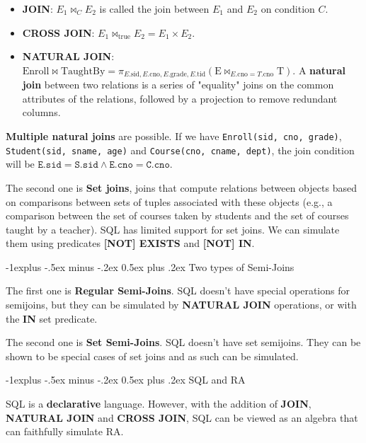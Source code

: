 \documentclass[10pt,landscape]{article}
\makeatletter
\newcommand{\term}[1]{{\color{blue} \textbf{#1}}}
\newcommand{\sql}[1]{{\color{cyan} \textbf{#1}}}
\newcommand{\exmp}[1]{{\texttt{#1}}}
\renewcommand{\subsection}{\@startsection{subsection}{2}{0mm}%
                                {-1explus -.5ex minus -.2ex}%
                                {0.5ex plus .2ex}%
                                {\normalfont\normalsize\bfseries}}
\makeatother
\begin{document}
\begin{multicols}{4}
\begin{itemize}
	\item \term{JOIN}: $E_1 \bowtie_C E_2$ is called the join between $E_1$ and $E_2$ on condition $C$.
	\item \term{CROSS JOIN}: $E_1 \bowtie_{\text{true}} E_2 = E_1 \times E_2$.
	\item \term{NATURAL JOIN}: $\text{Enroll} \bowtie \text{TaughtBy} = \pi_{E.\text{sid}, E.\text{cno}, E.\text{grade}, E.\text{tid}} (\text{E} \bowtie_{E.\text{cno} = T.\text{cno}} \text{T})$. A \term{natural join} between two relations is a series of "equality" joins on the common attributes of the relations, followed by a projection to remove redundant columns.
\end{itemize}

\term{Multiple natural joins} are possible. If we have \exmp{Enroll({\color{red}sid}, {\color{cyan}cno}, grade)}, \exmp{Student({\color{red}sid}, sname, age)} and \exmp{Course({\color{cyan}cno}, cname, dept)}, the join condition will be $\mathtt{E.sid = S.sid \land E.cno = C.cno}$.

The second one is \term{Set joins}, joins that compute relations between objects based on comparisons between sets of tuples associated with these objects (e.g., a comparison between the set of courses taken by students and the set of courses taught by a teacher). SQL has limited support for set joins. We can simulate them using predicates \sql{[NOT] EXISTS} and \sql{[NOT] IN}.

\subsection{Two types of Semi-Joins}

The first one is \term{Regular Semi-Joins}. SQL doesn't have special operations for semijoins, but they can be simulated by \term{NATURAL JOIN} operations, or with the \sql{IN} set predicate.

The second one is \term{Set Semi-Joins}. SQL doesn't have set semijoins. They can be shown to be special cases of set joins and as such can be simulated.

\subsection{SQL and RA}

SQL is a \term{declarative} language. However, with the addition of \term{JOIN}, \term{NATURAL JOIN} and \term{CROSS JOIN}, SQL can be viewed as an algebra that can faithfully simulate RA.


\end{multicols}
\end{document}
